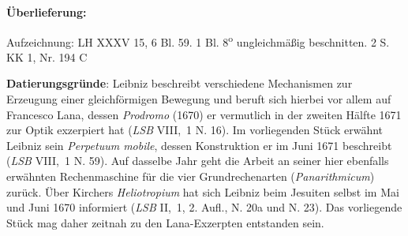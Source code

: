 ﻿      
               
                \begin{ledgroupsized}[r]{120mm}
                \footnotesize 
                \pstart                
                \noindent\textbf{\"{U}berlieferung:}   
                \pend
                \end{ledgroupsized}
            
              
                            \begin{ledgroupsized}[r]{114mm}
                            \footnotesize 
                            \pstart \parindent -6mm
                             Aufzeichnung: LH XXXV 15, 6 Bl. 59. 1 Bl. 8\textsuperscript{o} ungleichm\"{a}{\ss}ig beschnitten. 2 S.\\KK 1, Nr. 194 C \pend
                            \end{ledgroupsized}
                \vspace*{5mm}
                \begin{ledgroup}
                \footnotesize 
                \pstart
            \noindent\footnotesize{\textbf{Datierungsgr\"{u}nde}: Leibniz beschreibt verschiedene Mechanismen zur Erzeugung einer gleichf\"{o}rmigen Bewegung und beruft sich hierbei vor allem auf Francesco Lana,
dessen \cite{00069}\textit{Prodromo} (1670) er vermutlich in der zweiten H\"{a}lfte 1671 zur Optik exzerpiert hat (\cite{01103}\textit{LSB} VIII,~1 N. 16).
Im vorliegenden St\"{u}ck erw\"{a}hnt Leibniz sein \textit{Perpetuum mobile},
dessen Konstruktion er im Juni 1671 beschreibt (\cite{01187}\textit{LSB} VIII,~1 N. 59).
Auf dasselbe Jahr geht die Arbeit an seiner hier ebenfalls erw\"{a}hnten Rechenmaschine für die vier Grundrechenarten (\textit{Panarithmicum}) zurück.
Über Kirchers \textit{Heliotropium} hat sich Leibniz beim Jesuiten selbst im Mai und Juni 1670 informiert (\cite{01188}\textit{LSB} II,~1, 2. Aufl., N. 20a und N. 23).
Das vorliegende Stück mag daher zeitnah zu den Lana-Exzerpten entstanden sein.}
                \pend
                \end{ledgroup}
            

